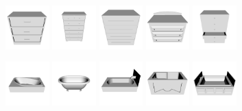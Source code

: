\begin{figure}[!t]
	\includegraphics[width=0.15\textwidth]{Figures/ObjRecog/dresser_0}\hfill
	\includegraphics[width=0.15\textwidth]{Figures/ObjRecog/dresser_1}\hfill
	\includegraphics[width=0.15\textwidth]{Figures/ObjRecog/dresser_2}\hfill
	\includegraphics[width=0.15\textwidth]{Figures/ObjRecog/dresser_3}\hfill
	\includegraphics[width=0.15\textwidth]{Figures/ObjRecog/dresser_4}\hfill
	
	\includegraphics[width=0.15\textwidth]{Figures/ObjRecog/bathtub_0}\hfill
	\includegraphics[width=0.15\textwidth]{Figures/ObjRecog/bathtub_1}\hfill
	\includegraphics[width=0.15\textwidth]{Figures/ObjRecog/bathtub_2}\hfill
	\includegraphics[width=0.15\textwidth]{Figures/ObjRecog/bathtub_3}\hfill
	\includegraphics[width=0.15\textwidth]{Figures/ObjRecog/bathtub_4}\hfill


\end{figure}
